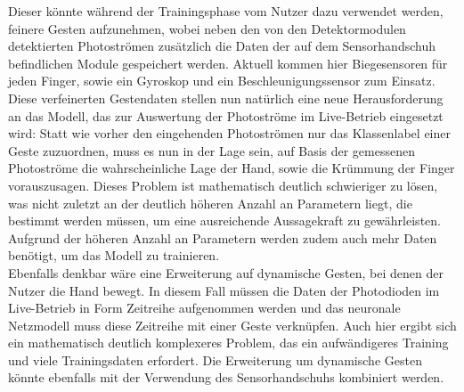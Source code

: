 Dieser könnte während der Trainingsphase vom Nutzer dazu verwendet werden, feinere Gesten aufzunehmen, wobei neben den von den Detektormodulen detektierten Photoströmen zusätzlich die Daten der auf dem Sensorhandschuh befindlichen Module gespeichert werden. Aktuell kommen hier Biegesensoren für jeden Finger, sowie ein Gyroskop und ein Beschleunigungssensor zum Einsatz. Diese verfeinerten Gestendaten stellen nun natürlich eine neue Herausforderung an das Modell, das zur Auswertung der Photoströme im Live-Betrieb eingesetzt wird: Statt wie vorher den eingehenden Photoströmen nur das Klassenlabel einer Geste zuzuordnen, muss es nun in der Lage sein, auf Basis der gemessenen Photoströme die wahrscheinliche Lage der Hand, sowie die Krümmung der Finger vorauszusagen. Dieses Problem ist mathematisch deutlich schwieriger zu lösen, was nicht zuletzt an der deutlich höheren Anzahl an Parametern liegt, die bestimmt werden müssen, um eine ausreichende Aussagekraft zu gewährleisten. Aufgrund der höheren Anzahl an Parametern werden zudem auch mehr Daten benötigt, um das Modell zu trainieren. \\
Ebenfalls denkbar wäre eine Erweiterung auf dynamische Gesten, bei denen der Nutzer die Hand bewegt. In diesem Fall müssen die Daten der Photodioden im Live-Betrieb in Form Zeitreihe aufgenommen werden und das neuronale Netzmodell muss diese Zeitreihe mit einer Geste verknüpfen. Auch hier ergibt sich ein mathematisch deutlich komplexeres Problem, das ein aufwändigeres Training und viele Trainingsdaten erfordert. Die Erweiterung um dynamische Gesten könnte ebenfalls mit der Verwendung des Sensorhandschuhs kombiniert werden.

